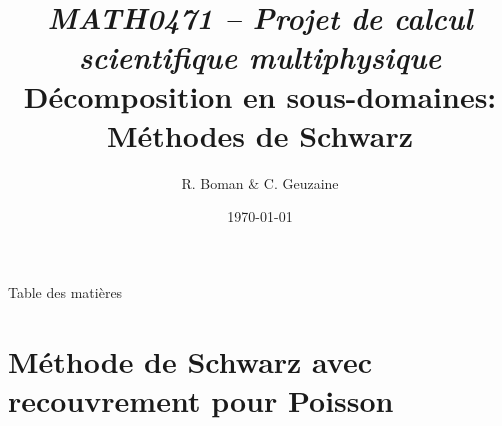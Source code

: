 \documentclass[
mode=present,    %
paper=a4paper,   %
orient=landscape,
display=slides,   %
size=10pt,
style=romain   %
]{powerdot}
\begin{document}
    \setlength{\belowdisplayskip}{2pt}
    \setlength{\belowdisplayshortskip}{2pt}
    \setlength{\abovedisplayskip}{2pt}
    \setlength{\abovedisplayshortskip}{2pt}

\title{\vspace{-5mm}
         {\sl\small MATH0471 -- Projet de calcul scientifique multiphysique} \\
        \vspace{5mm}
        \Large Décomposition en sous-domaines:\\ Méthodes de Schwarz\\
        \vspace{5mm}
}
\author{R. Boman \& C. Geuzaine}
\date{\today}
\maketitle


\begin{slide}[toc=,bm=]{Table des matières}
\tableofcontents[content=all] %
\end{slide}

\newcommand{\nn}{\mathbf{n}}
\newcommand{\dn}{\partial_{\mathbf{n}}}
\newcommand{\dsp}{\displaystyle}
\newcommand{\Ascr} {{\mathscr A}}
\newcommand{\Rb} {{\mathbb{R}}}
\newcommand{\dd}     {{\rm d}}
\newcommand{\Pb} {{\mathbb{P}}}
\newcommand{\Ab} {{\mathbb{A}}}
\newcommand{\UU} {{\mathbf{U}}}
\newcommand{\ff} {{\mathbf{f}}}
\newcommand{\an}{a_{n}}
\newcommand{\bn}{b_{n}}
\newcommand{\cn}{c_{n}}
\newcommand{\dnn}{d_{n}}
\newcommand{\en}{e_{n}}
\newcommand{\fn}{f_{n}}
\newcommand{\gn}{g_{n}}
\newcommand{\un}{u_{n}}
\newcommand{\vn}{v_{n}}
\newcommand{\wn}{w_{n}}
\newcommand{\zn}{z_{n}}
\newcommand{\Sn}{S_{n}}
\newcommand{\Arccos}{{\rm Arccos}}
\newcommand{\Arcsin}{{\rm Arcsin}}
\newcommand{\Arctan}{{\rm Arctan}}
\newcommand{\ch}{{\rm ch}}
\newcommand{\sh}{{\rm sh}}
\newcommand{\Ndom}{N_{{\rm dom}}}
\newcommand{\uh}{u_{h}}
\newcommand{\vh}{v_{h}}
\newcommand{\uhi}{u_{h}^{i}}

\section[toc=Poisson avec overlap]{Méthode de Schwarz avec recouvrement pour
Poisson}
\end{document}
